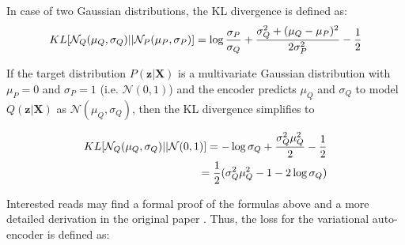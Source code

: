 In case of two Gaussian distributions, the KL divergence is defined as:
\begin{equation}\eqlbl{hso_4}
	KL[\mathcal{N}_Q(\mu_Q, \sigma_Q)||\mathcal{N}_P(\mu_P, \sigma_P)] = \log \frac{\sigma_P}{\sigma_Q} + \frac{\sigma_Q^2 + (\mu_Q-\mu_P)^2}{2\sigma_P^2} - \frac{1}{2}
\end{equation}


If the target distribution $P(\boldsymbol{z}|\boldsymbol{X})$ is a multivariate Gaussian distribution with $\mu_P = 0$ and $\sigma_P=1$ (i.e. $\mathcal{N}(0, 1)$) and the encoder predicts $\mu_Q$ and $\sigma_Q$ to model $Q(\boldsymbol{z}|\boldsymbol{X})$ as $\mathcal{N}(\mu_Q, \sigma_Q)$, then the KL divergence simplifies to

\begin{equation}\eqlbl{hso_5}
	\begin{align}
		KL[\mathcal{N}_Q(\mu_Q, \sigma_Q)||\mathcal{N}(0, 1)] = -\log \sigma_Q + \frac{\sigma_Q^2 \mu_Q^2}{2} - \frac{1}{2}\\
			= \frac{1}{2} (\sigma_Q^2 \mu_Q^2 - 1 - 2\log \sigma_Q)
	\end{align}
\end{equation}

Interested reads may find a formal proof of the formulas above and a more detailed derivation in the original paper \cite{Kingma_Welling_2014}.
Thus, the loss for the variational auto-encoder is defined as:











